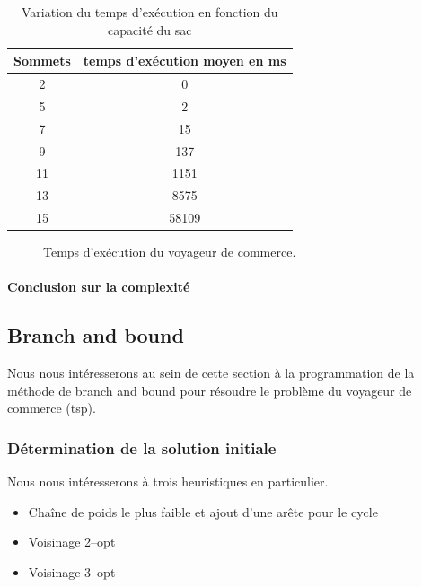 \documentclass[a4paper, 12pt]{article}
\begin{document}
\begin{table}[h!]
\centering
\begin{tabular}{|c|c|}
\hline
Sommets & temps d'exécution moyen en ms\\
\hline
2 & 0\\
\hline
5 & 2\\
\hline
7 & 15\\
\hline
9 & 137\\
\hline
11 & 1151\\
\hline
13 & 8575\\
\hline
15 & 58109\\
\hline
\end{tabular}
\caption {Variation du temps d'exécution en fonction du capacité du sac}
\end{table}


\begin{figure}[h!]
\centering
{}
\caption{Temps d'exécution du voyageur de commerce.}
\end{figure}

\paragraph{Conclusion sur la complexité}

\pagebreak

\subsection{Branch and bound}

Nous nous intéresserons au sein de cette section à la programmation de
la méthode de branch and bound pour résoudre le problème du voyageur
de commerce (tsp).

\subsubsection{Détermination de la solution initiale}

 Nous nous intéresserons à trois heuristiques en particulier.
\begin{itemize}
\item Chaîne de poids le plus faible et ajout d'une arête pour le
  cycle
\item Voisinage 2--opt
\item Voisinage 3--opt
\end{itemize}
\end{document}
